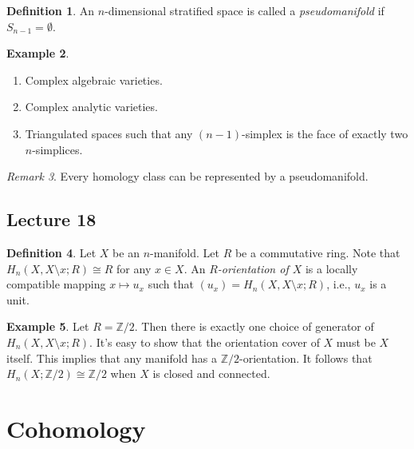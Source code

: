 \documentclass[10pt,letterpaper,cm]{nupset}
\theoremstyle{definition}
\newtheorem{definition}{Definition}[subsection]
\newtheorem{exmp}[definition]{Example}
\theoremstyle{theorem}
\theoremstyle{remark}
\newtheorem{remark}[definition]{Remark}
\newcommand{\Z}{\mathbb Z}
\newcommand{\1}{\mathbb{1}}
\newcommand{\0}{\vec 0}
\begin{document}
\begin{definition}
An $n$-dimensional stratified space is called a \textit{pseudomanifold} if $S_{n-1} = \emptyset$.
\end{definition}

\begin{exmp} $ $
\begin{enumerate}
\item Complex algebraic varieties.
\item Complex analytic varieties.
\item Triangulated spaces such that any $(n-1)$-simplex is the face of exactly two $n$-simplices. 
\end{enumerate}
\end{exmp}

\begin{remark}
Every homology class can be represented by a pseudomanifold. 
\end{remark}

\subsection{Lecture 18}

\begin{definition}
Let $X$ be an $n$-manifold. Let $R$ be a commutative ring. Note that $H_n(X, X \setminus x; R) \cong R$ for any $x\in X$.  An \textit{$R$-orientation of $X$} is a locally compatible mapping $x\mapsto u_x$  such that $(u_x) = H_n(X, X \setminus x; R)$, i.e., $u_x$ is a unit.
\end{definition}

\begin{exmp}
Let $R= \Z/2$. Then there is exactly one choice of generator of $ H_n(X, X \setminus x; R)$. It's easy to show that the orientation cover of $X$ must be $X$ itself. This implies that any manifold has a $\Z/2$-orientation. It follows that $H_n(X; \Z/2) \cong \Z/2$ when $X$ is closed and connected. 
\end{exmp}

\section{Cohomology} 
\end{document}
